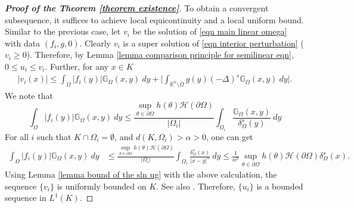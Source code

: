 \documentclass{amsart}
\newcommand{\R}{\mathbb{R}}
\newcommand{\slap}{(-\Delta)^{s}}
\newcommand{\gk}[1]{\mathbb{G}_{#1}}
\begin{document}
\begin{proof}[\textbf{Proof of the Theorem \ref{theorem existence}}]
     To obtain a convergent subsequence, it suffices to achieve local equicontinuity and a local uniform bound. Similar to the previous case, let $v_{i}$ be the solution of \eqref{eqn main linear omega} with data $(f_i,g,0)$.
    Clearly $v_{i}$ is a super solution of \eqref{eqn interior perturbation} ( $v_{i}\geq 0$). Therefore, by Lemma \ref{lemma comparison principle for semilinear eqn}, $0\leq u_{i}\leq v_{i}$. Further, for any $x\in K$
    \begin{equation*}
        \begin{split}
            |v_{i}(x)|\leq \int_{\Omega}|f_{i}(y)|\gk{\Omega}(x,y)\ dy+\Big|\int_{\R^{n}\setminus\overline{\Omega}}g(y)\slap \gk{\Omega}(x,y)\ dy\Big|. 
        \end{split}
    \end{equation*}
    We note that 
    \begin{equation*}
         \int_{\Omega}|f_{i}(y)|\gk{\Omega}(x,y)\ dy\leq \frac{\displaystyle\sup_{\theta\in \partial\Omega}h(\theta) \mathcal{H}(\partial\Omega)}{|\Omega_{i}|}\int_{\Omega_{i}}\frac{\gk{\Omega}(x,y)}{\delta_{\Omega}^{s}(y)}\ dy
    \end{equation*}
    For all $i$ such that $K\cap \Omega_{i}=\emptyset$, and $d(K,\Omega_{i})>\alpha>0$,  one can get 
      \begin{equation*}
      \begin{split}
                \int_{\Omega}|f_{i}(y)|\gk{\Omega}(x,y)\ dy &\leq \frac{\displaystyle\sup_{\theta\in \partial\Omega}h(\theta) \mathcal{H}(\partial\Omega)}{|\Omega_{i}|}\int_{\Omega_{i}}\frac{\delta_{\Omega}^{s}(x)}{|x-y|^{n}}\ dy 
                \leq \frac{1}{\alpha^{n}}\displaystyle\sup_{\theta\in \partial\Omega}h(\theta) \mathcal{H}(\partial\Omega)\delta_{\Omega}^{s}(x).
      \end{split}
 \end{equation*}
 Using Lemma \ref{lemma bound of the sln ug} with the above calculation, the sequence $\{v_{i}\}$ is uniformly bounded on $K$. See also \cite[Lemma 2.9]{Abatangelo2015LargesHarmonic}. Therefore, $\{u_{i}\}$ is a bounded sequence in $L^{1}(K)$.


\end{proof}
\end{document}
